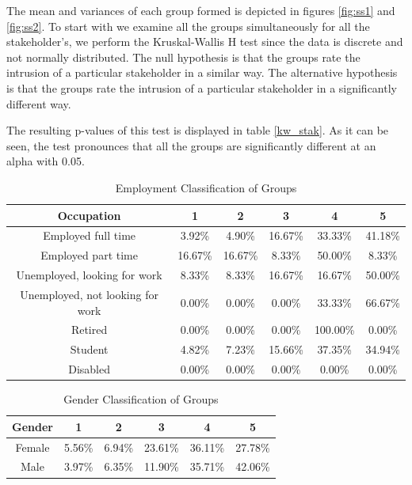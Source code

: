 The mean and variances of each group formed is depicted in figures \ref{fig:ss1} and \ref{fig:ss2}.
To start with we examine all the groups simultaneously for all the stakeholder's, we perform the Kruskal-Wallis H test since the data is discrete and not normally distributed. The null hypothesis is that the groups rate the intrusion of a particular stakeholder in a similar way. The alternative hypothesis is that the groups rate the intrusion of a particular stakeholder in a significantly different way.

The resulting p-values of this test is displayed in table \ref{kw_stak}. As it can be seen, the test pronounces that all the groups are significantly different at an alpha with 0.05. 

\begin{table}[h!]
  \centering
  \caption{Employment Classification of Groups}
  \label{tab:emp_stak}
  \begin{tabular}{cccccc}
    \toprule
     Occupation&1&2&3&4&5\\
    \midrule
Employed full time	&3.92\%	&4.90\%	&16.67\%	&33.33\%	&41.18\%\\
Employed part time	&16.67\%	&16.67\%	&8.33\%	&50.00\%	&8.33\%\\
Unemployed, looking for work	&8.33\%	&8.33\%	&16.67\%	&16.67\%	&50.00\%\\
Unemployed, not looking for work	&0.00\%	&0.00\%	&0.00\%	&33.33\%	&66.67\%\\
Retired	&0.00\%	&0.00\%	&0.00\%	&100.00\%&	0.00\%\\
Student	&4.82\%	&7.23\%	&15.66\%	&37.35\%	&34.94\%\\
Disabled	&0.00\%	&0.00\%	&0.00\%	&0.00\%	&0.00\%\\
    \bottomrule
  \end{tabular}
\end{table}



\begin{table}[h!]
  \centering
  \caption{Gender Classification of Groups}
  \label{tab:gender_stak}
  \begin{tabular}{cccccc}
    \toprule
     Gender&1&2&3&4&5 \\
     \midrule
Female&5.56\%&6.94\%&23.61\%&36.11\%&27.78\% \\
Male&3.97\%&6.35\%&11.90\%&35.71\%&42.06\%\\
    \bottomrule
  \end{tabular}
\end{table}



